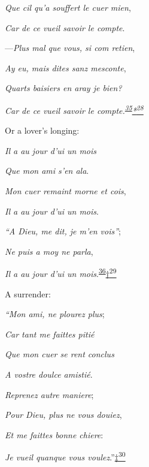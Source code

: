 \emph{Que cil qu'a souffert le cuer mien},

\emph{Car de ce vueil savoir le compte}.

---\emph{Plus mal que vous, si com retien},

\emph{Ay eu, mais dites sanz mesconte},

\emph{\protect\hypertarget{21_Chapter_Thirteen__IMAGE_AND_WORD.xhtmlux5cux23page_359}{}{}Quarts
baisiers en aray je bien?}

\emph{Car de ce vueil savoir le
compte.\textsuperscript{\protect\hypertarget{21_Chapter_Thirteen__IMAGE_AND_WORD.xhtmlux5cux23id_240}{\protect\hyperlink{23_NOTES.xhtmlux5cux23id_241}{35}}}\protect\hypertarget{21_Chapter_Thirteen__IMAGE_AND_WORD.xhtmlux5cux23id_2749}{\protect\hyperlink{23_NOTES.xhtmlux5cux23id_2750}{*\textsuperscript{28}}}}

Or a lover's longing:

\emph{Il a au jour d'ui un mois}

\emph{Que mon ami s'en ala}.

\emph{Mon cuer remaint morne et cois},

\emph{Il a au jour d'ui un mois}.

\emph{``A Dieu, me dit, je m'en vois''};

\emph{Ne puis a moy ne parla},

\emph{Il a au jour d'ui un
mois}.\textsuperscript{\protect\hypertarget{21_Chapter_Thirteen__IMAGE_AND_WORD.xhtmlux5cux23id_238}{\protect\hyperlink{23_NOTES.xhtmlux5cux23id_239}{36}}}\protect\hypertarget{21_Chapter_Thirteen__IMAGE_AND_WORD.xhtmlux5cux23id_2751}{\protect\hyperlink{23_NOTES.xhtmlux5cux23id_2752}{†\textsuperscript{29}}}

A surrender:

\emph{``Mon ami, ne plourez plus};

\emph{Car tant me faittes pitié}

\emph{Que mon cuer se rent conclus}

\emph{A vostre doulce amistié}.

\emph{Reprenez autre maniere};

\emph{Pour Dieu, plus ne vous douiez},

\emph{Et me faittes bonne chiere}:

\emph{Je vueil quanque vous
voulez}.''\protect\hypertarget{21_Chapter_Thirteen__IMAGE_AND_WORD.xhtmlux5cux23id_2753}{\protect\hyperlink{23_NOTES.xhtmlux5cux23id_2754}{‡\textsuperscript{30}}}

